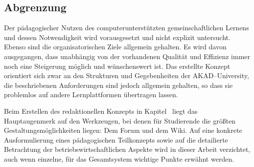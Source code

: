 \subsection{Abgrenzung} %
\label{sub:abgrenzung}
Der pädagogischer Nutzen des computerunterstützten gemeinschaftlichen Lernens und dessen Notwendigkeit wird vorausgesetzt und nicht explizit untersucht. Ebenso sind die organisatorischen Ziele allgemein gehalten. Es wird davon ausgegangen, dass unabhängig von der vorhandenen Qualität und Effizienz immer noch eine Steigerung möglich und wünschenswert ist. Das erstellte Konzept orientiert sich zwar an den Strukturen und Gegebenheiten der AKAD–University, die beschriebenen Anforderungen sind jedoch allgemein gehalten, so dass sie problemlos auf andere Lernplattformen übertragen lassen. 

Beim Erstellen des redaktionellen Konzepts in Kapitel~ liegt das Hauptaugenmerk auf den Werkzeugen, bei denen für Studierende die größten Gestaltungsmöglichkeiten liegen: Dem Forum und dem Wiki. Auf eine konkrete Ausformulierung eines pädagogischen Teilkonzepts sowie auf die detailierte Betrachtung der betriebswirtschaftlichen Aspekte wird in dieser Arbeit verzichtet, auch wenn einzelne, für das Gesamtsystem wichtige Punkte erwähnt werden.

